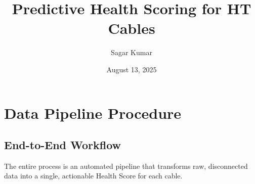 \documentclass[a4paper,11pt]{article}
\title{Predictive Health Scoring for HT Cables}
\author{Sagar Kumar}
\date{August 13, 2025}
\begin{document}
\maketitle
\newpage

\begin{spacing}{2.5}
    \tableofcontents
\end{spacing}
\newpage


\section{Data Pipeline Procedure}

\subsection{End-to-End Workflow}
The entire process is an automated pipeline that transforms raw, disconnected data into a single, actionable Health Score for each cable.
\end{document}
